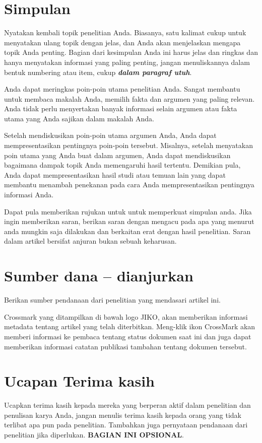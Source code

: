 \documentclass[
 manuscript=article,  %
  layout=publish, 
  year=2024, 
  month= Februari, %
  volume=8,
  number=1 
]{JIKO}
\begin{document}
\section{Simpulan}

Nyatakan kembali topik penelitian Anda. Biasanya, satu kalimat cukup untuk menyatakan ulang topik dengan jelas, dan Anda akan menjelaskan mengapa topik Anda penting. Bagian dari kesimpulan Anda ini harus jelas dan ringkas dan hanya menyatakan informasi yang paling penting, jangan menuliskannya dalam bentuk numbering atau item, cukup \textbf{\textit{dalam paragraf utuh}}.

Anda dapat meringkas poin-poin utama penelitian Anda. Sangat membantu untuk membaca makalah Anda, memilih fakta dan argumen yang paling relevan. Anda tidak perlu menyertakan banyak informasi selain argumen atau fakta utama yang Anda sajikan dalam makalah Anda.

Setelah mendiskusikan poin-poin utama argumen Anda, Anda dapat mempresentasikan pentingnya poin-poin tersebut. Misalnya, setelah menyatakan poin utama yang Anda buat dalam argumen, Anda dapat mendiskusikan bagaimana dampak topik Anda memengaruhi hasil tertentu. Demikian pula, Anda dapat mempresentasikan hasil studi atau temuan lain yang dapat membantu menambah penekanan pada cara Anda mempresentasikan pentingnya informasi Anda.

Dapat pula memberikan rujukan \cite{Erwi2015,Rikie,Erwi2015}untuk untuk memperkuat simpulan anda. Jika ingin memberikan saran, berikan saran dengan mengacu pada apa yang menurut anda mungkin saja dilakukan dan berkaitan erat dengan hasil penelitian. Saran dalam artikel bersifat anjuran bukan sebuah keharusan\cite{Rikie,Kolodzy}.



\section*{Sumber dana -- dianjurkan}
Berikan sumber pendanaan dari penelitian yang mendasari artikel ini.  
 
Crossmark yang ditampilkan di bawah logo JIKO, akan memberikan informasi metadata tentang artikel yang telah diterbitkan. 
 Meng-klik ikon CrossMark akan memberi informasi ke pembaca tentang status dokumen saat ini dan juga dapat memberikan informasi catatan publikasi tambahan tentang dokumen tersebut.

\section*{Ucapan Terima kasih}
Ucapkan terima kasih kepada mereka yang berperan aktif dalam penelitian dan penulisan karya Anda, jangan menulis terima kasih kepada orang yang tidak terlibat apa pun pada penelitian.
Tambahkan juga pernyataan pendanaan dari penelitian jika diperlukan.
\textbf{BAGIAN INI OPSIONAL}.
\end{document}
